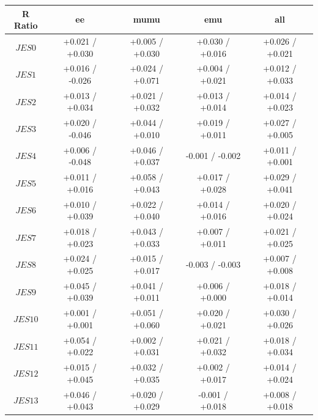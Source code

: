  \begin{table}[htbp]
\footnotesize
   \begin{center}
   \begin{tabular}{|c|c|c|c|c|}
   \hline
     \textbf{R Ratio}           &  ee &mumu &emu&all\\
   \hline
   $JES 0$                             &  +0.021   / +0.030   & +0.005   / +0.030   & +0.030   / +0.016   & +0.026   / +0.021   \\
   $JES 1$                             &  +0.016   / -0.026   & +0.024   / +0.071   & +0.004   / +0.021   & +0.012   / +0.033   \\
   $JES 2$                             &  +0.013   / +0.034   & +0.021   / +0.032   & +0.013   / +0.014   & +0.014   / +0.023   \\
   $JES 3$                             &  +0.020   / -0.046   & +0.044   / +0.010   & +0.019   / +0.011   & +0.027   / +0.005   \\
   $JES 4$                             &  +0.006   / -0.048   & +0.046   / +0.037   & -0.001   / -0.002   & +0.011   / +0.001   \\
   $JES 5$                             &  +0.011   / +0.016   & +0.058   / +0.043   & +0.017   / +0.028   & +0.029   / +0.041   \\
   $JES 6$                             &  +0.010   / +0.039   & +0.022   / +0.040   & +0.014   / +0.016   & +0.020   / +0.024   \\
   $JES 7$                             &  +0.018   / +0.023   & +0.043   / +0.033   & +0.007   / +0.011   & +0.021   / +0.025   \\
   $JES 8$                             &  +0.024   / +0.025   & +0.015   / +0.017   & -0.003   / -0.003   & +0.007   / +0.008   \\
   $JES 9$                             &  +0.045   / +0.039   & +0.041   / +0.011   & +0.006   / +0.000   & +0.018   / +0.014   \\
   $JES {10}$                          &  +0.001   / +0.001   & +0.051   / +0.060   & +0.020   / +0.021   & +0.030   / +0.026   \\
   $JES {11}$                          &  +0.054   / +0.022   & +0.002   / +0.031   & +0.021   / +0.032   & +0.018   / +0.034   \\
   $JES {12}$                          &  +0.015   / +0.045   & +0.032   / +0.035   & +0.002   / +0.017   & +0.014   / +0.024   \\
   $JES {13}$                          &  +0.046   / +0.043   & +0.020   / +0.029   & -0.001   / +0.018   & +0.008   / +0.018   \\

\end{tabular}
\end{center}
\end{table}
